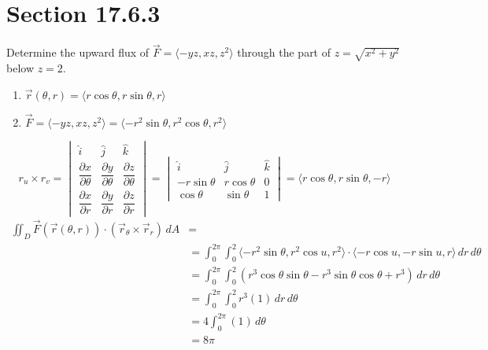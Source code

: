 \documentclass[letter,11pt]{article}
\begin{document}
\section*{Section 17.6.3} 
Determine the upward flux of $\vec{F}=\langle-y z, x z, z^{2}\rangle$ through the part of $z=\sqrt{x^{2}+y^{2}}$ below $z=2$.
\begin{enumerate}[label = \roman*.]
    \item $\vec{r}\left(\theta,r\right)=\langle r\cos \theta ,r\sin \theta,r\rangle$
    \item $\vec{F}=\langle-y z, x z, z^{2}\rangle = \langle -r^{2}\sin \theta,r^{2}\cos \theta,r^{2}\rangle$
\end{enumerate}
$$ r_{u}\times r_{v}=
\begin{vmatrix}
\hat{i} & \hat{j} & \hat{k}\\[1em]
\dfrac{\partial x}{\partial \theta} & \dfrac{\partial y}{\partial \theta} & \dfrac{\partial z}{\partial \theta}\\[1em]
\dfrac{\partial x}{\partial r} & \dfrac{\partial y}{\partial r} & \dfrac{\partial z}{\partial r}
\end{vmatrix}
=
\begin{vmatrix}
\hat{i} & \hat{j} & \hat{k}\\
-r\sin \theta & r\cos \theta & 0\\
\cos \theta & \sin \theta & 1
\end{vmatrix}
= \langle r\cos \theta, r\sin \theta, -r \rangle
$$
\begin{align*}
\iint_{D} \vec{F}\left(\vec{r}\left(\theta,r\right)\right) \cdot \left(\vec{r}_{\theta}\times \vec{r}_{r}\right) \, dA &=\\
    &= \int_{0}^{2\pi}\int_{0}^{2} \langle -r^{2}\sin \theta,r^{2}\cos u,r^{2}\rangle \cdot \langle -r\cos u, -r\sin u, r \rangle \, dr \, d\theta\\
    &=  \int_{0}^{2\pi}\int_{0}^{2} \left(r^3\cos \theta \sin \theta-r^3\sin \theta \cos \theta +r^3\right) \, dr \, d\theta\\
    &= \int_{0}^{2\pi}\int_{0}^{2}r^{3}\left(1\right) \, dr \, d\theta\\
    &= 4\int_{0}^{2\pi}\left(1\right)\, d\theta\\
    &= \boxed{8\pi}
\end{align*}
\end{document}
